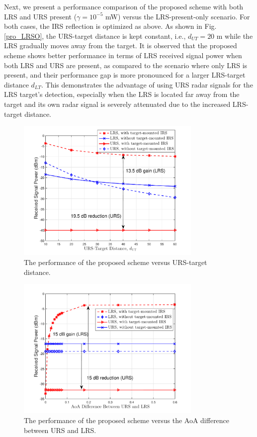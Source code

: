 \documentclass[10pt,final,doublecolumn]{IEEEtran}
\begin{document}
Next, we present a performance comparison of the proposed scheme with both LRS and URS present ($\gamma=10^{-5}$ mW) versus the LRS-present-only scenario. For both cases, the IRS reflection is optimized as above. As
shown in Fig. \ref{pro_LRSO}, the URS-target distance is kept constant, i.e., $d_{UT}=20$ m while the LRS gradually moves away from the target. It is observed that the proposed scheme shows better performance in terms of LRS received signal power when both LRS and URS are present, as compared to the scenario where only LRS is present, and their performance gap is more pronounced for a larger LRS-target distance $d_{LT}$.
This demonstrates the advantage of using URS radar signals for the LRS target's detection, especially when the LRS is located far away from the target and its own radar signal is severely attenuated due to the increased LRS-target distance.
\begin{figure}[t]
\centering
\setlength{\abovecaptionskip}{0.cm}
\includegraphics[width=3.5in]{distance_short.pdf}
\caption{The performance of the proposed scheme versus  URS-target distance.}
\label{distance_short}
\end{figure}

\begin{figure}[t]
\centering
\setlength{\abovecaptionskip}{0.cm}
\includegraphics[width=3.5in]{angle_short.pdf}
\caption{The performance of the proposed scheme versus the AoA difference between URS and LRS.}
\label{angle_short}
\end{figure}
\end{document}
